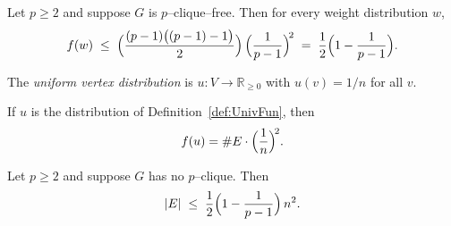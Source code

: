 \begin{lemma}\label{lem:finale-bound}
Let $p\ge 2$ and suppose $G$ is $p$–clique–free. Then for every weight distribution $w$,
\[
  f(w)\;\le\;\Bigl(\frac{(p-1)\bigl((p-1)-1\bigr)}{2}\Bigr)\,\Bigl(\frac1{p-1}\Bigr)^{\!2}
  \;=\;\frac12\Bigl(1-\frac1{p-1}\Bigr).
\]
\end{lemma}

\begin{definition}\label{def:UnivFun}
\leanok
The \emph{uniform vertex distribution} is $u:V\to\mathbb R_{\ge0}$ with $u(v)=1/n$ for all $v$.
\end{definition}

\begin{lemma}\label{lem:UnivFun-weight}
\leanok
If $u$ is the distribution of Definition~\ref{def:UnivFun}, then
\[
  f(u)=\#E\cdot\Bigl(\frac1n\Bigr)^{\!2}.
\]
\end{lemma}

\begin{theorem}\label{thm:turans}
Let $p\ge 2$ and suppose $G$ has no $p$–clique. Then
\[
  |E|
  \;\le\;
  \frac12\Bigl(1-\frac1{p-1}\Bigr)\,n^2.
\]
\end{theorem}